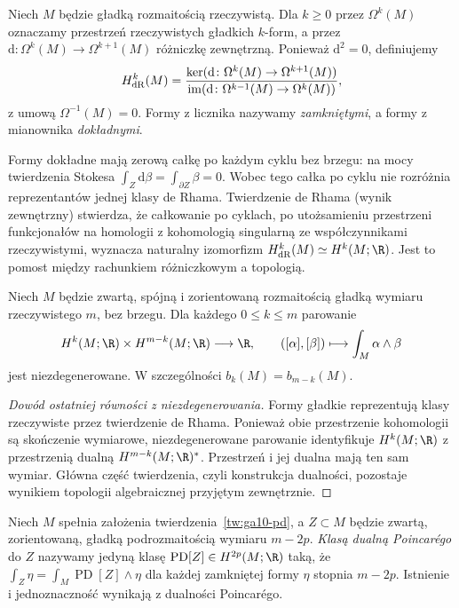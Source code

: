 \begin{definicja}
Niech $M$ będzie gładką rozmaitością rzeczywistą.
Dla $k\ge0$ przez $\Omega^k(M)$ oznaczamy przestrzeń
rzeczywistych gładkich $k$-form, a przez $\mathrm d\colon\Omega^k(M)
\to\Omega^{k+1}(M)$ różniczkę zewnętrzną. Ponieważ $\mathrm d^2=0$,
definiujemy
\[
 H^k_{\rm dR}(M)=\frac{\ker(\mathrm d\colon\Omega^k(M)\to
 \Omega^{k+1}(M))}{\operatorname{im}(\mathrm d\colon
 \Omega^{k-1}(M)\to\Omega^k(M))},
\]
z umową $\Omega^{-1}(M)=0$. Formy z licznika nazywamy
\emph{zamkniętymi}, a formy z mianownika \emph{dokładnymi}.
\end{definicja}

\begin{uwaga}
Formy dokładne mają zerową całkę po każdym cyklu bez brzegu:
na mocy twierdzenia Stokesa $\int_Z\mathrm d\beta
=\int_{\partial Z}\beta=0$. Wobec tego całka po cyklu
nie rozróżnia reprezentantów jednej klasy de Rhama.
Twierdzenie de Rhama (wynik zewnętrzny) stwierdza,
że całkowanie po cyklach, po utożsamieniu przestrzeni
funkcjonałów na homologii z kohomologią singularną
ze współczynnikami rzeczywistymi, wyznacza naturalny
izomorfizm $H^k_{\rm dR}(M)\simeq H^k(M;\R)$.
Jest to pomost między rachunkiem różniczkowym a topologią.
\end{uwaga}

\begin{twierdzenie}
\label{tw:ga10-pd}
Niech $M$ będzie zwartą, spójną i zorientowaną rozmaitością
gładką wymiaru rzeczywistego $m$, bez brzegu.
Dla każdego $0\le k\le m$ parowanie
\[
 H^k(M;\R)\times H^{m-k}(M;\R)\longrightarrow\R,
 \qquad ([\alpha],[\beta])\longmapsto\int_M\alpha\wedge\beta
\]
jest niezdegenerowane. W szczególności $b_k(M)=b_{m-k}(M)$.
\end{twierdzenie}

\begin{proof}[Dowód ostatniej równości z niezdegenerowania]
Formy gładkie reprezentują klasy rzeczywiste przez twierdzenie
de Rhama. Ponieważ obie przestrzenie kohomologii są skończenie
wymiarowe, niezdegenerowane parowanie identyfikuje
$H^k(M;\R)$ z przestrzenią dualną $H^{m-k}(M;\R)^*$.
Przestrzeń i jej dualna mają ten sam wymiar.
Główna część twierdzenia, czyli konstrukcja dualności,
pozostaje wynikiem topologii algebraicznej przyjętym zewnętrznie.
\end{proof}

\begin{definicja}
Niech $M$ spełnia założenia twierdzenia~\ref{tw:ga10-pd},
a $Z\subset M$ będzie zwartą, zorientowaną, gładką
podrozmaitością wymiaru $m-2p$.
\emph{Klasą dualną Poincarégo} do $Z$ nazywamy
jedyną klasę $\operatorname{PD}[Z]\in H^{2p}(M;\R)$ taką, że
$\int_Z\eta=\int_M\operatorname{PD}[Z]\wedge\eta$
dla każdej zamkniętej formy $\eta$ stopnia $m-2p$.
Istnienie i jednoznaczność wynikają z dualności Poincarégo.
\end{definicja}

